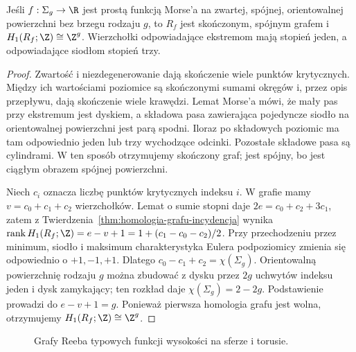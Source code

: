 \begin{twierdzenie}
\label{thm:graf-reeba-rodzaj-22}
Jeśli $f:\Sigma_g\to\R$ jest prostą funkcją
Morse'a na zwartej, spójnej, orientowalnej powierzchni
bez brzegu rodzaju $g$, to $R_f$ jest skończonym,
spójnym grafem i $H_1(R_f;\Z)\cong\Z^g$.
Wierzchołki odpowiadające ekstremom mają stopień
jeden, a odpowiadające siodłom stopień trzy.
\end{twierdzenie}
\begin{proof}
Zwartość i niezdegenerowanie dają skończenie wiele
punktów krytycznych. Między ich wartościami poziomice
są skończonymi sumami okręgów i, przez opis przepływu,
dają skończenie wiele krawędzi. Lemat Morse'a mówi,
że mały pas przy ekstremum jest dyskiem, a składowa
pasa zawierająca pojedyncze siodło na orientowalnej
powierzchni jest parą spodni. Iloraz po składowych
poziomic ma tam odpowiednio jeden lub trzy wychodzące
odcinki. Pozostałe składowe pasa są cylindrami.
W ten sposób otrzymujemy skończony graf; jest spójny,
bo jest ciągłym obrazem spójnej powierzchni.

Niech $c_i$ oznacza liczbę punktów krytycznych indeksu
$i$. W grafie mamy $v=c_0+c_1+c_2$ wierzchołków.
Lemat o sumie stopni daje
$2e=c_0+c_2+3c_1$, zatem z
Twierdzenia~\ref{thm:homologia-grafu-incydencja}
wynika $\operatorname{rank}H_1(R_f;\Z)=e-v+1
=1+(c_1-c_0-c_2)/2$.
Przy przechodzeniu przez minimum, siodło i maksimum
charakterystyka Eulera podpoziomicy zmienia się
odpowiednio o $+1,-1,+1$. Dlatego
$c_0-c_1+c_2=\chi(\Sigma_g)$.
Orientowalną powierzchnię rodzaju $g$ można zbudować
z dysku przez $2g$ uchwytów indeksu jeden i dysk
zamykający; ten rozkład daje $\chi(\Sigma_g)=2-2g$.
Podstawienie prowadzi do $e-v+1=g$.
Ponieważ pierwsza homologia grafu jest wolna,
otrzymujemy $H_1(R_f;\Z)\cong\Z^g$.
\end{proof}

\begin{figure}[htbp]
\centering
{}
\caption{Grafy Reeba typowych funkcji wysokości na sferze i torusie.}
\label{fig:grafy-reeba-22}
\end{figure}

